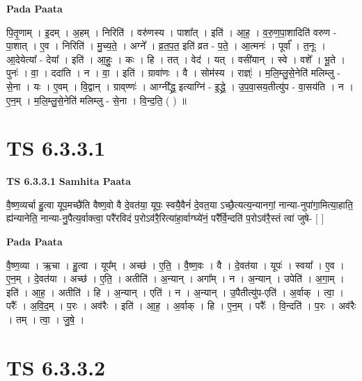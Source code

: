 \documentclass[17pt]{extarticle}
\begin{document}
\textbf{Pada Paata} \newline

पि॒तृ॒णाम् । इ॒दम् । अ॒हम् । निरिति॑ । वरु॑णस्य । पाशा᳚त् । इति॑ । आ॒ह॒ । व॒रु॒ण॒पा॒शादिति॑ वरुण - पा॒शात् । ए॒व । निरिति॑ । मु॒च्य॒ते॒ । अग्ने᳚ । व्र॒त॒प॒त॒ इति॑ व्रत - प॒ते॒ । आ॒त्मनः॑ । पूर्वा᳚ । त॒नूः । आ॒देयेत्या᳚ - देया᳚ । इति॑ । आ॒हुः॒ । कः । हि । तत् । वेद॑ । यत् । वसी॑यान् । स्वे । वशे᳚ । भू॒ते । पुनः॑ । वा॒ । ददा॑ति । न । वा॒ । इति॑ । ग्रावा॑णः । वै । सोम॑स्य । राज्ञ्ः॑ । म॒लि॒म्लु॒से॒नेति॑ मलिम्लु - से॒ना । यः । ए॒वम् । वि॒द्वान् । ग्राव्‌ण्णः॑  । आग्नी᳚द्ध्र॒ इत्याग्नि॑ - इ॒द्ध्रे॒ । उ॒प॒वा॒सय॒तीत्यु॑प - वा॒सय॑ति । न । ए॒न॒म् । म॒लि॒म्लु॒से॒नेति॑ मलिम्लु - से॒ना । वि॒न्द॒ति॒ ( ) ॥  \newline





\section{ TS 6.3.3.1 }

\textbf{TS 6.3.3.1 } \newline
\textbf{Samhita Paata} \newline

वै॒ष्ण॒व्यर्चा हु॒त्वा यूप॒मच्छै॑ति वैष्ण॒वो वै दे॒वत॑या॒ यूपः॒ स्वयै॒वैनं॑ दे॒वत॒या ऽच्छै॒त्यत्य॒न्यानगां॒ नान्या-नुपा॑गा॒मित्या॒हाति॒ ह्य॑न्यानेति॒ नान्या-नु॒पैत्य॒र्वाक्त्वा॒ परै॑रविदं प॒रोऽव॑रै॒रित्या॑हा॒र्वाग्घ्ये॑नं॒ परै᳚र्वि॒न्दति॑ प॒रोऽव॑रै॒स्तं त्वा॑ जुषे- [  ] \newline

\textbf{Pada Paata} \newline

वै॒ष्ण॒व्या । ऋ॒चा । हु॒त्वा । यूप᳚म् । अच्छ॑ । ए॒ति॒ । वै॒ष्ण॒वः । वै । दे॒वत॑या । यूपः॑ । स्वया᳚ । ए॒व । ए॒न॒म् । दे॒वत॑या । अच्छ॑ । ए॒ति॒ । अतीति॑ । अ॒न्यान् । अगा᳚म् । न । अ॒न्यान् । उपेति॑ । अ॒गा॒म् । इति॑ । आ॒ह॒ । अतीति॑ । हि । अ॒न्यान् । एति॑ । न । अ॒न्यान् । उ॒पैतीत्यु॑प-एति॑ । अ॒र्वाक् । त्वा॒ । परैः᳚ । अ॒वि॒द॒म् । प॒रः । अव॑रैः । इति॑ । आ॒ह॒ । अ॒र्वाक् । हि । ए॒न॒म् । परैः᳚ । वि॒न्दति॑ । प॒रः । अव॑रैः । तम् । त्वा॒ । जु॒षे॒ ।  \newline





\section{ TS 6.3.3.2 }
\end{document}
